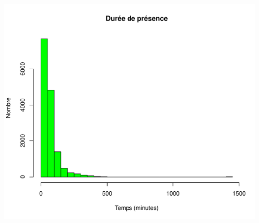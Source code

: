 \documentclass[12pt,english,french,twoside]{book}\usepackage[]{graphicx}\usepackage[]{color}
\makeatletter
\def\maxwidth{ %
  \ifdim\Gin@nat@width>\linewidth
    \linewidth
  \else
    \Gin@nat@width
  \fi
}
\newenvironment{knitrout}{}{} %
\makeatother
\begin{document}
\begin{knitrout}
\color{fgcolor}
\includegraphics[width=\maxwidth]{figure/graphe_p_gueb-1} 

\end{knitrout}
\end{document}
